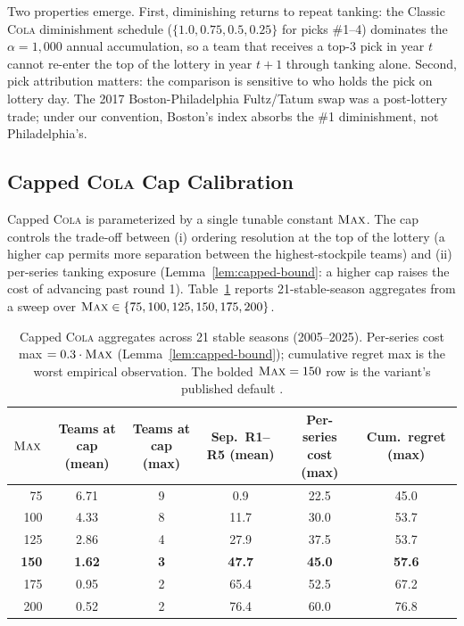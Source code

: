 \documentclass{article}
\newcommand{\cola}{\textup{\textsc{Cola}}}
\newcommand{\Max}{\textup{\textsc{Max}}}
\begin{document}
Two properties emerge. First, diminishing returns to repeat tanking: the Classic \cola{} diminishment schedule ($\{1.0, 0.75, 0.5, 0.25\}$ for picks \#1--4) dominates the $\alpha = 1{,}000$ annual accumulation, so a team that receives a top-3 pick in year $t$ cannot re-enter the top of the lottery in year $t + 1$ through tanking alone. Second, pick attribution matters: the comparison is sensitive to who holds the pick on lottery day. The 2017 Boston-Philadelphia Fultz/Tatum swap was a post-lottery trade; under our convention, Boston's index absorbs the \#1 diminishment, not Philadelphia's.

\subsection{Capped \cola{} Cap Calibration}

Capped \cola{} is parameterized by a single tunable constant $\Max$. The cap controls the trade-off between (i) ordering resolution at the top of the lottery (a higher cap permits more separation between the highest-stockpile teams) and (ii) per-series tanking exposure (Lemma~\ref{lem:capped-bound}: a higher cap raises the cost of advancing past round 1). Table~\ref{tab:cap-sweep} reports 21-stable-season aggregates from a sweep over $\Max \in \{75, 100, 125, 150, 175, 200\}$.

\begin{table}[t]
\centering
\small
\begin{tabular}{rccccc}
\toprule
$\Max$ & Teams at cap (mean) & Teams at cap (max) & Sep.\ R1--R5 (mean) & Per-series cost (max) & Cum.\ regret (max) \\
\midrule
75  & 6.71 & 9 &  0.9 & 22.5 & 45.0 \\
100 & 4.33 & 8 & 11.7 & 30.0 & 53.7 \\
125 & 2.86 & 4 & 27.9 & 37.5 & 53.7 \\
\textbf{150} & \textbf{1.62} & \textbf{3} & \textbf{47.7} & \textbf{45.0} & \textbf{57.6} \\
175 & 0.95 & 2 & 65.4 & 52.5 & 67.2 \\
200 & 0.52 & 2 & 76.4 & 60.0 & 76.8 \\
\bottomrule
\end{tabular}
\caption{Capped \cola{} aggregates across 21 stable seasons (2005--2025). Per-series cost max $= 0.3 \cdot \Max$ (Lemma~\ref{lem:capped-bound}); cumulative regret max is the worst empirical observation. The bolded $\Max = 150$ row is the variant's published default \citep{highley2026solvable5}.}
\label{tab:cap-sweep}
\end{table}
\end{document}
